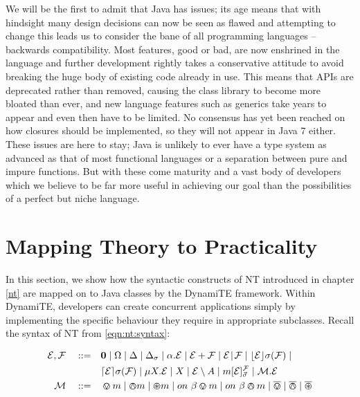 We will be the first to admit that Java has issues; its age means that
with hindsight many design decisions can now be seen as flawed and
attempting to change this leads us to consider the bane of all
programming languages -- backwards compatibility.  Most features, good
or bad, are now enshrined in the language and further development
rightly takes a conservative attitude to avoid breaking the huge body
of existing code already in use.  This means that APIs are deprecated
rather than removed, causing the class library to become more bloated
than ever, and new language features such as generics take years to
appear and even then have to be limited.  No consensus has yet been
reached on how closures should be implemented, so they will not appear
in Java 7 either.  These issues are here to stay; Java is unlikely to
ever have a type system as advanced as that of most functional
languages or a separation between pure and impure functions.  But with
these come maturity and a vast body of developers which we believe to
be far more useful in achieving our goal than the possibilities of a
perfect but niche language.

\section{Mapping Theory to Practicality}
\label{dyn:maptheory}

In this section, we show how the syntactic constructs of NT introduced
in chapter \ref{nt} are mapped on to Java classes by the DynamiTE
framework.  Within DynamiTE, developers can create concurrent
applications simply by implementing the specific behaviour they
require in appropriate subclasses.  Recall the syntax of NT from
\ref{eqn:nt:syntax}:

\begin{equation}
  \begin{aligned}
    \text{$\mathcal{E}$}, \text{$\mathcal{F}$} \quad \mathrel{::=} \quad &
      \textbf{0}  \mid
      \Omega \mid
      \Delta \mid
      \Delta_{\sigma} \mid
      \alpha . \text{$\mathcal{E}$}  \mid
      \text{$\mathcal{E}$} + \text{$\mathcal{F}$} \mid
      \text{$\mathcal{E}$} \mathrel{\!|\!} \text{$\mathcal{F}$} \mid
      \lfloor{\text{$\mathcal{E}$}}\rfloor {\sigma} ({\text{$\mathcal{F}$}}) \mid \\
    & \lceil{\text{$\mathcal{E}$}}\rceil {\sigma} ({\text{$\mathcal{F}$}}) \mid 
      \mu X . \text{$\mathcal{E}$} \mid
      X \mid 
      \text{$\mathcal{E}$} \setminus {A} \mid
      {m}[ \text{$\mathcal{E}$} ]^{\text{$\mathcal{F}$}}_{\vec{\sigma}} \mid
      \text{$\mathcal{M}$} . \text{$\mathcal{E}$} \\
   \text{$\mathcal{M}$} \quad \mathrel{::=} \quad & \varovee m \mid \varowedge m \mid \varoast m \mid
      on\ \beta \varovee m \mid on\ \beta \varowedge m \mid \overline{\varovee} \mid
      \overline{\varowedge} \mid \overline{\varoast}
   \end{aligned}
\end{equation}

